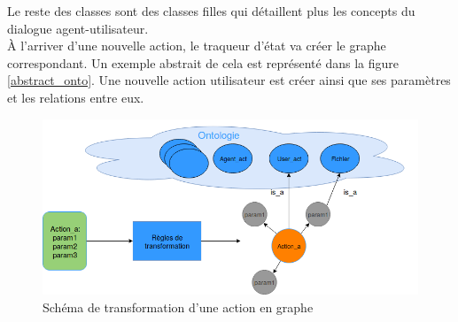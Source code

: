 Le reste des classes sont des classes filles qui détaillent plus les concepts du dialogue agent-utilisateur.\\
À l'arriver d'une nouvelle action, le traqueur d'état va créer le graphe correspondant. Un exemple abstrait de cela est représenté dans la figure \ref{abstract_onto}. Une nouvelle action utilisateur est créer ainsi que ses paramètres et les relations entre eux.
\begin{figure}[H] 
	\centering
	\includegraphics[width=0.88\linewidth]{images/Conception/DM/abstract_onto.png}
	\caption{Schéma de transformation d'une action en graphe}
	
\end{figure}\label{abstract_onto}
